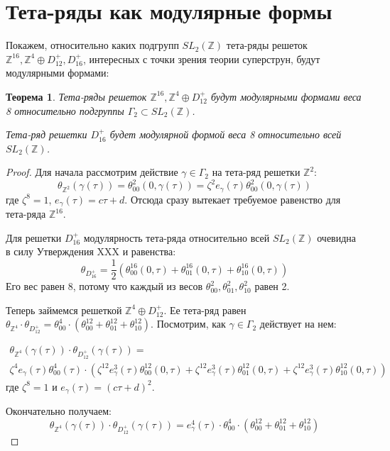 \documentclass{article}
\newcommand{\ZZ}{\mathbb{Z}}
\theoremstyle{break}
\newtheorem{theorem}{Теорема}[section]
\begin{document}
\section{Тета-ряды как модулярные формы}

Покажем, относительно каких подгрупп $SL_2(\ZZ)$ тета-ряды решеток $\ZZ^{16}, \ZZ^4 \oplus D_{12}^+, D_{16}^+$, интересных с точки зрения теории суперструн, будут модулярными формами:


\begin{theorem}
	Тета-ряды решеток $\ZZ^{16},  \ZZ^4 \oplus D_{12}^+$ будут модулярными формами
	веса 8 относительно подгруппы $\Gamma_2 \subset SL_2(\ZZ)$.
	
	Тета-ряд решетки $D_{16}^+$ будет модулярной формой веса 8 относительно всей $SL_2(\ZZ)$.
\end{theorem}

\begin{proof}
	Для начала рассмотрим действие $\gamma \in \Gamma_2$ на тета-ряд решетки $\ZZ^{2}$:
	$$
		\theta_{\ZZ^2}(\gamma(\tau))=\theta_{00}^2(0, \gamma(\tau)) = \zeta^2 e_{\gamma}(\tau) \theta^2_{00}(0, \gamma(\tau))
	$$
	где $\zeta^8=1$, $e_\gamma(\tau)=c \tau + d$. Отсюда сразу вытекает требуемое равенство для тета-ряда $\ZZ^{16}$.
	
	Для решетки $D_{16}^+$ модулярность тета-ряда относительно всей $SL_2(\ZZ)$ очевидна в силу Утверждения XXX и равенства:
	$$\theta_{D_{16}^+}=\frac{1}{2}(\theta_{00}^{16}(0, \tau) + \theta_{01}^{16}(0, \tau) + \theta_{10}^{16}(0, \tau))$$
	Его вес равен 8, потому что каждый из весов 
	$\theta_{00}^2, \theta_{01}^2, \theta_{10}^2$ равен 2.
	
	Теперь займемся решеткой $\ZZ^4 \oplus D_{12}^+$. Ее тета-ряд равен $\theta_{\ZZ^4} \cdot \theta_{D_{12}^+} = \theta_{00}^4 \cdot (\theta_{00}^{12} + \theta_{01}^{12} + \theta_{10}^{12})$. Посмотрим, как $\gamma \in \Gamma_2$ действует на нем:

\begin{equation*}
	\begin{split}
		\theta_{\ZZ^4}(\gamma(\tau)) \cdot \theta_{D_{12}^+}(\gamma(\tau)) = \\		
		\zeta^4 e_{\gamma}(\tau)\theta_{00}^4 (\tau) \cdot
		(
			\zeta^{12} e_{\gamma}^3(\tau)\theta_{00}^{12} (0, \tau)
			+ \zeta^{12} e_{\gamma}^3(\tau)\theta_{01}^{12} (0, \tau)
			+ \zeta^{12} e_{\gamma}^3(\tau)\theta_{10}^{12} (0, \tau)
		)
	\end{split}
\end{equation*}
	где $\zeta^8=1$ и $e_\gamma(\tau) = (c\tau + d)^2$.
	
	Окончательно получаем:
	$$
		\theta_{\ZZ^4}(\gamma(\tau)) \cdot \theta_{D_{12}^+}(\gamma(\tau))
		=
		e_{\gamma}^4(\tau)\cdot \theta_{00}^4 \cdot (\theta_{00}^{12} + \theta_{01}^{12} + \theta_{10}^{12})
	$$
	
\end{proof}
\end{document}
